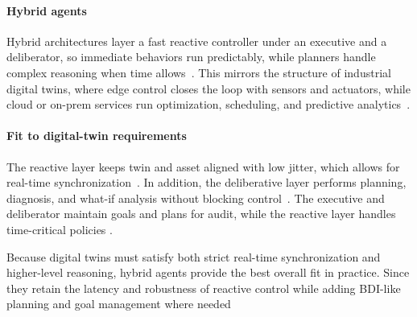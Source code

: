 \paragraph{Hybrid agents}
Hybrid architectures layer a fast reactive controller under an executive and a deliberator, so immediate behaviors run predictably, while planners handle complex reasoning when time allows~\cite{gat1998three,bonasso1997experiences}. This mirrors the structure of industrial digital twins, where edge control closes the loop with sensors and actuators, while cloud or on-prem services run optimization, scheduling, and predictive analytics~\cite{jones2020characterising, Liu2024DTMMReview}.

\paragraph{Fit to digital-twin requirements}

The reactive layer keeps twin and asset aligned with low jitter, which allows for real-time synchronization~\cite{tan2024dtsync}.
In addition, the deliberative layer performs planning, diagnosis, and what-if analysis without blocking control~\cite{jones2020characterising, Liu2024DTMMReview}. The executive and deliberator maintain goals and plans for audit, while the reactive layer handles time-critical policies \cite{rao1995bdi, Alelaimat2023XPlaM}.



Because digital twins must satisfy both strict real-time synchronization and higher-level reasoning, hybrid agents provide the best overall fit in practice. Since they retain the latency and robustness of reactive control while adding BDI-like planning and goal management where needed~\cite{gat1998three, bonasso1997experiences, jones2020characterising, Alelaimat2023XPlaM}



